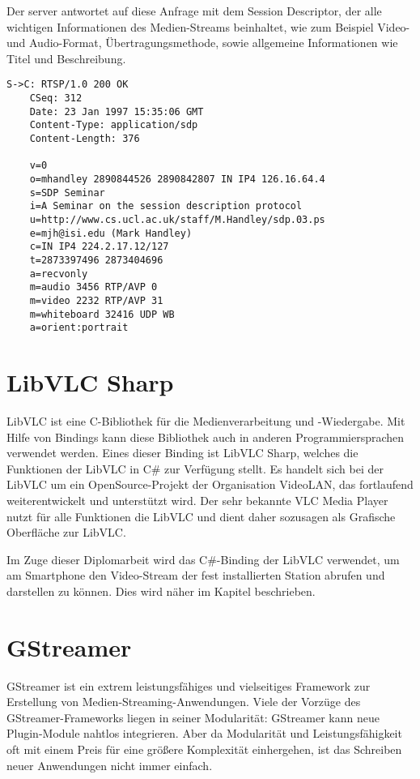 Der server antwortet auf diese Anfrage mit dem Session Descriptor, der alle wichtigen Informationen des Medien-Streams beinhaltet, wie zum Beispiel Video- und Audio-Format, Übertragungsmethode, sowie allgemeine Informationen wie Titel und Beschreibung.
\begin{lstlisting}
S->C: RTSP/1.0 200 OK
    CSeq: 312
    Date: 23 Jan 1997 15:35:06 GMT
    Content-Type: application/sdp
    Content-Length: 376

    v=0
    o=mhandley 2890844526 2890842807 IN IP4 126.16.64.4
    s=SDP Seminar
    i=A Seminar on the session description protocol
    u=http://www.cs.ucl.ac.uk/staff/M.Handley/sdp.03.ps
    e=mjh@isi.edu (Mark Handley)
    c=IN IP4 224.2.17.12/127
    t=2873397496 2873404696
    a=recvonly
    m=audio 3456 RTP/AVP 0
    m=video 2232 RTP/AVP 31
    m=whiteboard 32416 UDP WB
    a=orient:portrait
\end{lstlisting}

\section{LibVLC Sharp}
LibVLC ist eine C-Bibliothek für die Medienverarbeitung und -Wiedergabe.
Mit Hilfe von Bindings kann diese Bibliothek auch in anderen Programmiersprachen verwendet werden.
Eines dieser Binding ist LibVLC Sharp, welches die Funktionen der LibVLC in C\# zur Verfügung stellt.
Es handelt sich bei der LibVLC um ein OpenSource-Projekt der Organisation VideoLAN, das fortlaufend weiterentwickelt und unterstützt wird. Der sehr bekannte VLC Media Player nutzt für alle Funktionen die LibVLC und dient daher sozusagen als Grafische Oberfläche zur LibVLC. \cite[vgl.][]{libvlc}\par

Im Zuge dieser Diplomarbeit wird das C\#-Binding der LibVLC verwendet, um am Smartphone den Video-Stream der fest installierten Station abrufen und darstellen zu können.
Dies wird näher im Kapitel  beschrieben.

\section{GStreamer}
GStreamer ist ein extrem leistungsfähiges und vielseitiges Framework zur Erstellung von Medien-Streaming-Anwendungen.
Viele der Vorzüge des GStreamer-Frameworks liegen in seiner Modularität:
GStreamer kann neue Plugin-Module nahtlos integrieren.
Aber da Modularität und Leistungsfähigkeit oft mit einem Preis für eine größere Komplexität einhergehen, ist das Schreiben neuer Anwendungen nicht immer einfach.
\cite[aus dem Englischen übersetzt]{gstreamer}\par


